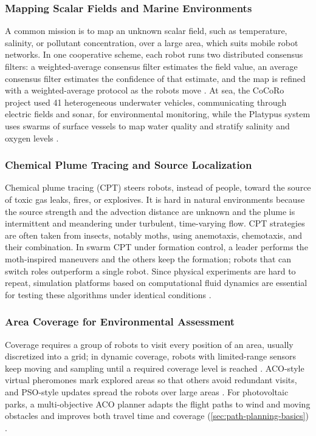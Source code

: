 \subsubsection{Mapping Scalar Fields and Marine Environments}

A common mission is to map an unknown scalar field, such as temperature,
salinity, or pollutant concentration, over a large area, which suits mobile robot
networks. In one cooperative scheme, each robot runs two distributed consensus
filters: a weighted-average consensus filter estimates the field value, an
average consensus filter estimates the confidence of that estimate, and the map
is refined with a weighted-average protocol as the robots move
\cite{tan2016handbook}. At sea, the CoCoRo project used 41 heterogeneous
underwater vehicles, communicating through electric fields and sonar, for
environmental monitoring, while the Platypus system uses swarms of surface
vessels to map water quality and stratify salinity and oxygen levels
\cite{shahzad2023review}.

\subsubsection{Chemical Plume Tracing and Source Localization}

Chemical plume tracing (CPT) steers robots, instead of people, toward the source
of toxic gas leaks, fires, or explosives. It is hard in natural environments
because the source strength and the advection distance are unknown and the plume
is intermittent and meandering under turbulent, time-varying flow. CPT strategies
are often taken from insects, notably moths, using anemotaxis, chemotaxis, and
their combination. In swarm CPT under formation control, a leader performs the
moth-inspired maneuvers and the others keep the formation; robots that can switch
roles outperform a single robot. Since physical experiments are hard to repeat,
simulation platforms based on computational fluid dynamics are essential for
testing these algorithms under identical conditions \cite{tan2016handbook}.

\subsubsection{Area Coverage for Environmental Assessment}

Coverage requires a group of robots to visit every position of an area, usually
discretized into a grid; in dynamic coverage, robots with limited-range sensors
keep moving and sampling until a required coverage level is reached
\cite{muhsen2024survey}. ACO-style virtual pheromones mark explored areas so that
others avoid redundant visits, and PSO-style updates spread the robots over large
areas \cite{nguyen2024swarm}. For photovoltaic parks, a multi-objective ACO
planner adapts the flight paths to wind and moving obstacles and improves both
travel time and coverage (\cref{sec:path-planning-basics})
\cite{ziouzios2025energy}.

